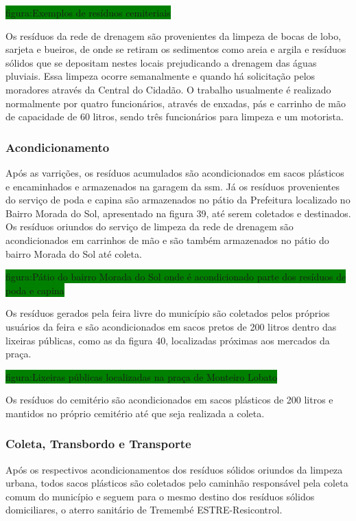 	\colorbox{green}{figura:Exemplos de resíduos cemiteriais}
	
	Os resíduos da rede de drenagem são provenientes da limpeza de bocas de lobo, sarjeta e bueiros, de onde se retiram os sedimentos como areia e argila e resíduos sólidos que se depositam nestes locais prejudicando a drenagem das águas pluviais. Essa limpeza ocorre semanalmente e quando há solicitação pelos moradores através da Central do Cidadão. O trabalho usualmente é realizado normalmente por quatro funcionários, através de enxadas, pás e carrinho de mão de capacidade de 60 litros, sendo três funcionários para limpeza e um motorista.
	
	\subsubsection{Acondicionamento}
	
	Após as varrições, os resíduos acumulados são acondicionados em sacos plásticos e encaminhados e armazenados na garagem da \gls{ssm}.  Já os resíduos provenientes do serviço de poda e capina são armazenados no pátio da Prefeitura localizado no Bairro Morada do Sol, apresentado na figura 39, até serem coletados e destinados. Os resíduos oriundos do serviço de limpeza da rede de drenagem são acondicionados em carrinhos de mão e são também armazenados no pátio do bairro Morada do Sol até coleta.
	
	\colorbox{green}{figura:Pátio do bairro Morada do Sol onde é acondicionado parte dos resíduos de poda e capina}
	
	Os resíduos gerados pela feira livre do município são coletados pelos próprios usuários da feira e são acondicionados em sacos pretos de 200 litros dentro das lixeiras públicas, como as da figura 40, localizadas próximas aos mercados da praça.
	
	\colorbox{green}{figura:Lixeiras públicas localizadas na praça de Monteiro Lobato}
	
	Os resíduos do cemitério são acondicionados em sacos plásticos de 200 litros e mantidos no próprio cemitério até que seja realizada a coleta.
	
	\subsubsection{Coleta, Transbordo e Transporte}
	
	Após os respectivos acondicionamentos dos resíduos sólidos oriundos da limpeza urbana, todos sacos plásticos são coletados pelo caminhão responsável pela coleta comum do município e seguem para o mesmo destino dos resíduos sólidos domiciliares, o aterro sanitário de Tremembé ESTRE-Resicontrol.
	
